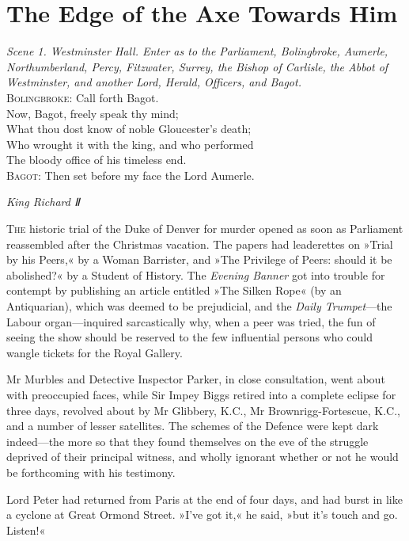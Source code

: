 

\chapter{The Edge of the Axe Towards Him}

\epigraph{
\textit{Scene 1. Westminster Hall. Enter as to the Parliament, Bolingbroke, Aumerle, Northumberland, Percy, Fitzwater, Surrey, the Bishop of Carlisle, the Abbot of Westminster, and another Lord, Herald, Officers, and Bagot.}\\
\textsc{Bolingbroke}: Call forth Bagot.\\
\indent Now, Bagot, freely speak thy mind;\\
\indent What thou dost know of noble Gloucester's death;\\
\indent Who wrought it with the king, and who performed\\
The bloody office of his timeless end.\\
\textsc{Bagot}: Then set before my face the Lord Aumerle.}{\textit{King Richard Ⅱ}}


\lettrine[lines=4]{T}{he} historic trial of the Duke of Denver for murder opened as soon as Parliament reassembled after the Christmas vacation. The papers had leaderettes on »Trial by his Peers,« by a Woman Barrister, and »The Privilege of Peers: should it be abolished?« by a Student of History.  The \textit{Evening Banner} got into trouble for contempt by publishing an article entitled »The Silken Rope« (by an Antiquarian), which was deemed to be prejudicial, and the \textit{Daily Trumpet}---the Labour organ\allowbreak---\allowbreak inquired sarcastically why, when a peer was tried, the fun of seeing the show should be reserved to the few influential persons who could wangle tickets for the Royal Gallery.

Mr Murbles and Detective Inspector Parker, in close consultation, went about with preoccupied faces, while Sir Impey Biggs retired into a complete eclipse for three days, revolved about by Mr Glibbery, K.C., Mr Brownrigg-Fortescue, K.C., and a number of lesser satellites. The schemes of the Defence were kept dark indeed\allowbreak---\allowbreak the more so that they found themselves on the eve of the struggle deprived of their principal witness, and wholly ignorant whether or not he would be forthcoming with his testimony.

Lord Peter had returned from Paris at the end of four days, and had burst in like a cyclone at Great Ormond Street. »I've got it,« he said, »but it's touch and go. Listen!«

